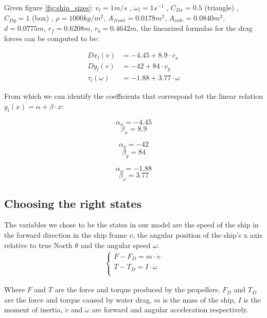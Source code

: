 Given figure \vref{fig:ship_sizes}:
 $ v_{l} = 1m/s $ , \quad
 $ \omega_{l} = 1 s ^{-1} $ ,\quad
 $ C_{Dx} = 0.5 $ (triangle) ,\quad
 $ C_{Dy} = 1 $ (box) ,\quad
 $ \rho = 1000 kg/m ^{2} $,\quad
 $ A_{front} = 0.0178 m^{2} $,\quad
 $ A_{side} = 0.0840 m ^{2} $,\quad
 $ d = 0.0775 m $,\quad
 $ r_{f} = 0.6208 m $,\quad
 $ r_{b} = 0.4642 m $,\quad
the linearized formulas for the drag forces can be computed to be:


\begin{align}
 Dx_{l}(v) &= -4.45 + 8.9 \cdot v_{x} \\
 Dy_{l}(v) &= -42 + 84 \cdot v_{y} \\
 \tau_{l}(\omega) &= -1.88 + 3.77 \cdot \omega
\end{align}

From which we can identify the coefficients that correspond tot the linear relation $ y_{l}(x) = \alpha + \beta \cdot x $:\\
\begin{minipage}{0.3\linewidth}
\[ \alpha_{x} = -4.45 \]
\[ \beta_{x} = 8.9 \]
\end{minipage}
\begin{minipage}{0.3\linewidth}
\[ \alpha_{y} = -42 \] 
\[ \beta_{y} = 84 \]
\end{minipage}
\begin{minipage}{0.3\linewidth}
\[ \alpha_{\omega} = -1.88 \]
\[ \beta_{\omega} = 3.77 \]
\end{minipage}


\subsection{Choosing the right states}

The variables we chose to be the states in our model are the speed of the ship in the forward direction in the ship frame $v$, the angular position of the ship's x axis relative to true North $\theta$ and the angular speed $\omega$.\\
\begin{align}\begin{cases}
F - F_{D} = m \cdot \dot{v}\\
T - T_{D} = I \cdot \dot{\omega}\\
\end{cases}\end{align}

Where $ F $ and $ T $ are the force and torque produced by the propellers, $ F_{D} $ and $ T_{D} $ are the force and torque caused by water drag, $ m $ is the mass of the ship, $ I $ is the moment of inertia, $ \dot{v} $  and $ \dot{\omega} $ are forward and angular acceleration respectively.

